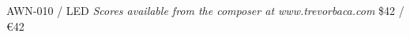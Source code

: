\documentclass{article}
\begin{document}
\null \vfill

AWN-010 / LED \hfill
\textit{Scores available from the composer at www.trevorbaca.com}
\hfill \$42 / \euro 42
\end{document}
